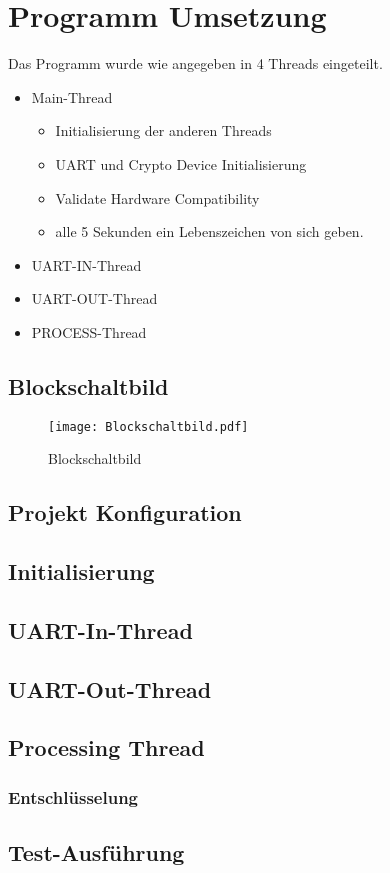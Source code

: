 \newpage
\section{Programm Umsetzung}
Das Programm wurde wie angegeben in 4 Threads eingeteilt.
\begin{itemize}
    \item Main-Thread
    \begin{itemize}
        \item Initialisierung der anderen Threads
        \item UART und Crypto Device Initialisierung 
        \item Validate Hardware Compatibility 
        \item alle 5 Sekunden ein Lebenszeichen von sich geben. 
    \end{itemize} 
    \item UART-IN-Thread
    \item UART-OUT-Thread
    \item PROCESS-Thread
\end{itemize}
\subsection{Blockschaltbild}
\begin{figure}[!ht]
    \centering
    \texttt{[image: Blockschaltbild.pdf]}
    \caption{Blockschaltbild}
    \label{fig:Blockschaltbild}
\end{figure}

\subsection{Projekt Konfiguration}
\subsection{Initialisierung}
\subsection{UART-In-Thread}
\subsection{UART-Out-Thread}
\subsection{Processing Thread}
\subsubsection{Entschlüsselung}

\subsection{Test-Ausführung}